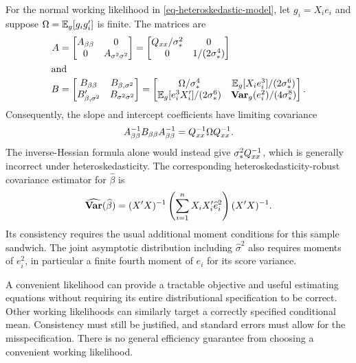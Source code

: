 \documentclass[a4paper,12pt]{article}
\begin{document}
For the normal working likelihood in \eqref{eq-heteroskedastic-model},
let $g_i=X_ie_i$ and suppose $\Omega=\operatorname{\mathbb{E}}_g[g_i g_i^{\prime}]$ is finite.
The matrices are
\begin{align}
	A &= 
	\begin{bmatrix*}
		A_{\beta\beta} & 0\\
		0 & A_{\sigma^2\sigma^2}
	\end{bmatrix*}
	=
	\begin{bmatrix*}
		Q_{xx}/\sigma_*^2 & 0\\
		0 & 1/(2\sigma_*^4)
	\end{bmatrix*} \\
	\shortintertext{and}
	B &=
	\begin{bmatrix*}
		B_{\beta\beta} & B_{\beta,\sigma^2}\\
		B_{\beta,\sigma^2}\T & B_{\sigma^2\sigma^2}
	\end{bmatrix*}
	=
	\begin{bmatrix*}
		\Omega/\sigma_*^4 & \E_g[X_ie_i^3]/(2\sigma_*^6)\\
		\E_g[e_i^3X_i\T]/(2\sigma_*^6) & \var_g(e_i^2)/(4\sigma_*^8)
	\end{bmatrix*}.
\end{align}
Consequently, the slope and intercept coefficients have limiting covariance
\begin{align}
	A_{\beta\beta}^{-1} B_{\beta\beta}A_{\beta\beta}^{-1}
	=Q_{xx}^{-1}\Omega Q_{xx}^{-1}.
\end{align}
The inverse-Hessian formula alone would instead give $\sigma_*^2Q_{xx}^{-1}$,
which is generally incorrect under heteroskedasticity.
The corresponding heteroskedasticity-robust covariance estimator for $\widehat\beta$ is
\begin{align}
	\widehat{\operatorname{\text{\textrm{\upshape\textbf{Var}}}}}(\widehat\beta)
	=(X^{\prime} X)^{-1}\left(\sum_{i=1}^nX_iX_i^{\prime}\widehat e_i^2\right)(X^{\prime} X)^{-1}.
\end{align}
Its consistency requires the usual additional moment conditions for this sample sandwich.
The joint asymptotic distribution including $\widehat\sigma^2$ also requires moments of $e_i^2$,
in particular a finite fourth moment of $e_i$ for its score variance.

\begin{remark}
	A convenient likelihood can provide a tractable objective and useful estimating equations
	without requiring its entire distributional specification to be correct.
	Other working likelihoods can similarly target a correctly specified conditional mean.
	Consistency must still be justified, and standard errors must allow for the misspecification.
	There is no general efficiency guarantee from choosing a convenient working likelihood.
\end{remark}
\end{document}
